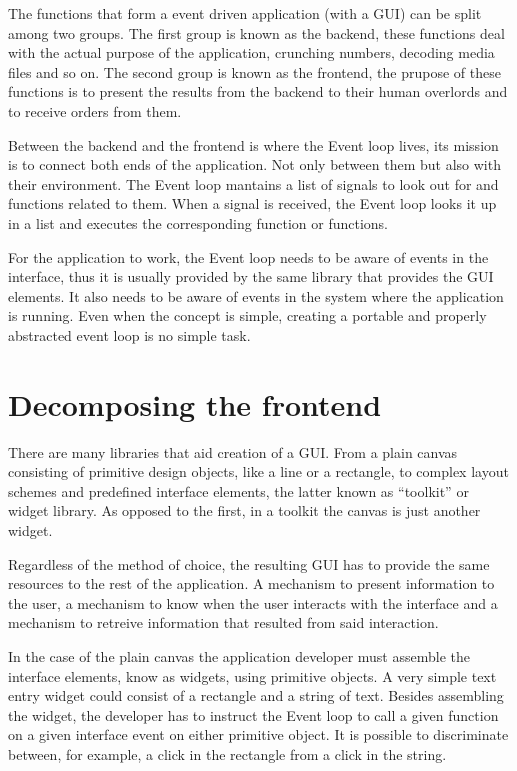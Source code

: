 \documentclass[12pt,a4paper,english]{book}
\begin{document}
The functions that form a event driven application (with a GUI) can be split
among two groups. The first group is known as the backend, these functions deal
with the actual purpose of the application, crunching numbers, decoding media
files and so on. The second group is known as the frontend, the prupose of
these functions is to present the results from the backend to their human
overlords and to receive orders from them.

Between the backend and the frontend is where the Event loop lives, its mission
is to connect both ends of the application. Not only between them but also with
their environment. The Event loop mantains a list of signals to look out for
and functions related to them. When a signal is received, the Event loop looks
it up in a list and executes the corresponding function or functions.

For the application to work, the Event loop needs to be aware of events in the
interface, thus it is  usually provided by the same library that provides the
GUI elements. It also needs to be aware of events in the system where the
application is running. Even when the concept is simple, creating a portable
and properly abstracted event loop is no simple task.



\hypertarget{decomposing-the-frontend}{}
\section{Decomposing the frontend}

There are many libraries that aid creation of a GUI. From a plain canvas
consisting of primitive design objects, like a line or a rectangle, to complex
layout schemes and predefined interface elements, the latter known as ``toolkit''
or widget library. As opposed to the first, in a toolkit the canvas is just
another widget.

Regardless of the method of choice, the resulting GUI has to provide the same
resources to the rest of the application. A mechanism to present information
to the user, a mechanism to know when the user interacts with the interface and
a mechanism to retreive information that resulted from said interaction.

In the case of the plain canvas the application developer must assemble the
interface elements, know as widgets, using primitive objects. A very simple
text entry widget could consist of a rectangle and a string of text. Besides
assembling the widget, the developer has to instruct the Event loop  to call a
given function on a given interface event on either primitive object. It is
possible to discriminate between, for example, a click in the rectangle from a
click in the string.
\end{document}
